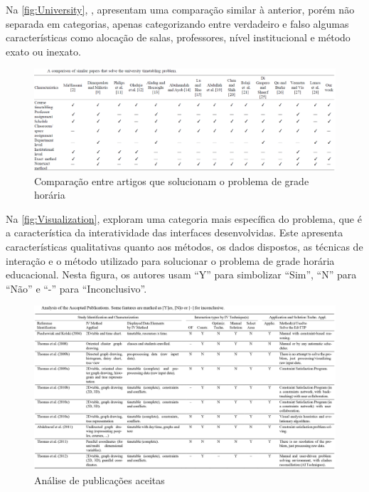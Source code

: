 Na \autoref{fig:University}, , apresentam uma comparação similar à anterior, porém não separada em categorias, apenas categorizando entre verdadeiro e falso algumas características como alocação de salas, professores, nível institucional e método exato ou inexato.

\begin{figure}[htbp]\centering
  \caption{Comparação entre artigos que solucionam o problema de grade horária}
  \label{fig:University}
  \includegraphics[width=\textwidth]{files/img/Tabelas/University}
\end{figure}    %

Na \autoref{fig:Visualization},  exploram uma categoria mais específica do problema, que é a característica da interatividade das interfaces desenvolvidas. Este apresenta características qualitativas quanto aos métodos, os dados dispostos, as técnicas de interação e o método utilizado para solucionar o problema de grade horária educacional. Nesta figura, os autores usam ``Y'' para simbolizar ``Sim'', ``N'' para ``Não'' e ``-'' para ``Inconclusivo''.

\begin{figure}[htbp]\centering
  \caption{Análise de publicações aceitas}
  \label{fig:Visualization}
  \includegraphics[width=\textwidth]{files/img/Tabelas/Visualization}
\end{figure}    %

